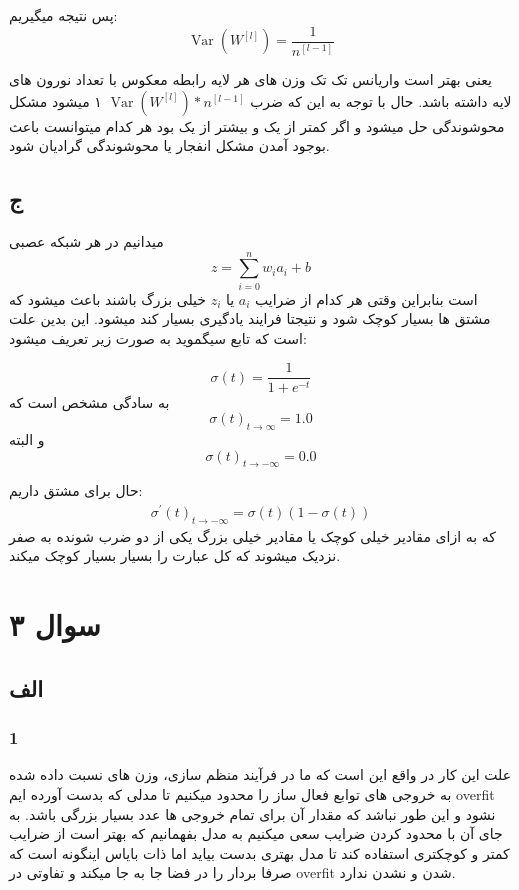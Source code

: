 \documentclass{article}[12pt]
\begin{document}
پس نتیجه میگیریم:
\begin{equation*}
	\operatorname{Var}\left(W^{[l]}\right)=\frac{1}{n^{[l-1]}}
\end{equation*}

یعنی بهتر است واریانس تک تک وزن های هر لایه رابطه معکوس با تعداد نورون های لایه داشته باشد. حال با توجه به این که ضرب 
$\operatorname{Var}\left(W^{[l]}\right) * {n^{[l-1]}}$
۱ میشود مشکل محوشوندگی حل میشود و اگر کمتر از یک و بیشتر از یک بود هر کدام میتوانست باعث بوجود آمدن مشکل انفجار یا محوشوندگی گرادیان شود. 

\subsection{ج}

میدانیم در هر شبکه عصبی 
\begin{equation*}
	z= \sum_{i=0}^{n} w_i a_i + b
\end{equation*}
است بنابراین وقتی هر کدام از ضرایب 
$a_i$
یا 
$z_i$
خیلی بزرگ باشند باعث میشود که مشتق ها بسیار کوچک شود و نتیجتا فرایند یادگیری بسیار کند میشود. این بدین علت است که تابع سیگموید به صورت زیر تعریف میشود:


\begin{equation*}
	\sigma(t)=\frac{1}{1+e^{-t}}
\end{equation*}
به سادگی مشخص است که 
\begin{equation*}
	\sigma(t)_{t \rightarrow \infty}=1.0
\end{equation*}
و البته 
\begin{equation*}
	\sigma(t)_{t \rightarrow-\infty}=0.0
\end{equation*}

حال برای مشتق داریم:
\begin{eqnarray}
	\sigma^\prime(t)_{t \rightarrow-\infty} = \sigma(t) (1-\sigma(t)) 
\end{eqnarray}
که به ازای مقادیر خیلی کوچک یا مقادیر خیلی بزرگ یکی از دو ضرب شونده به صفر نزدیک میشوند که کل عبارت را بسیار بسیار کوچک میکند. 
\section{سوال ۳}
\subsection{الف}
\subsubsection{1}
علت این کار در واقع این است که ما در فرآیند منظم سازی، وزن های نسبت  داده شده به خروجی های توابع فعال ساز را محدود میکنیم تا مدلی که بدست آورده ایم overfit نشود و این طور نباشد که مقدار آن برای تمام خروجی ها عدد بسیار بزرگی باشد. به جای آن با محدود کردن ضرایب سعی میکنیم به مدل بفهمانیم که بهتر است از ضرایب کمتر و کوچکتری استفاده کند تا مدل بهتری بدست بیاید اما ذات بایاس اینگونه است که صرفا بردار را در فضا جا به جا میکند و تفاوتی در overfit شدن و نشدن ندارد. 
\end{document}
